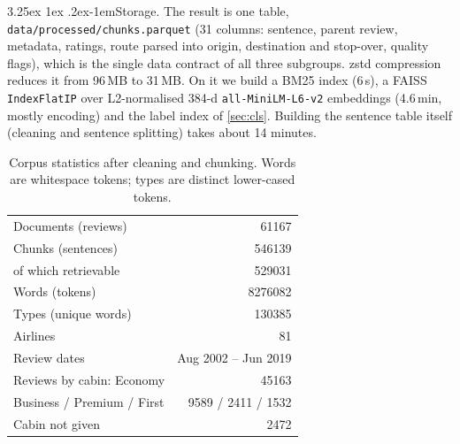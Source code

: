 \documentclass[10pt,twocolumn,a4paper]{article}
\makeatletter
\renewcommand\paragraph{\@startsection{paragraph}{4}{\parindent}%
  {3.25ex \@plus 1ex \@minus .2ex}{-1em}{\normalfont\normalsize\bfseries}}
\makeatother
\begin{document}
\paragraph{Storage.} The result is one table, \nolinkurl{data/processed/chunks.parquet} (31 columns: sentence, parent
review, metadata, ratings, route parsed into origin, destination and stop-over, quality flags), which is the single
data contract of all three subgroups. zstd compression reduces it from 96\,MB to 31\,MB. On it we build a BM25 index
(6\,s), a FAISS \texttt{IndexFlatIP} over L2-normalised 384-d \texttt{all-MiniLM-L6-v2} embeddings (4.6\,min, mostly encoding) and the
label index of \cref{sec:cls}. Building the sentence table itself (cleaning and sentence splitting) takes about
14 minutes.

\begin{table}[t]
\centering\small
\caption{Corpus statistics after cleaning and chunking. Words are whitespace tokens; types are distinct lower-cased tokens.}
\label{tab:corpus}
\begin{tabular}{@{}lr@{}}
\toprule
Documents (reviews) & \num{61167} \\
Chunks (sentences) & \num{546139} \\
\quad of which retrievable & \num{529031} \\
Words (tokens) & \num{8276082} \\
Types (unique words) & \num{130385} \\
Airlines & 81 \\
Review dates & Aug 2002 -- Jun 2019 \\
Reviews by cabin: Economy & \num{45163} \\
\quad Business / Premium / First & \num{9589} / \num{2411} / \num{1532} \\
\quad Cabin not given & \num{2472} \\
\bottomrule
\end{tabular}
\end{table}
\end{document}
